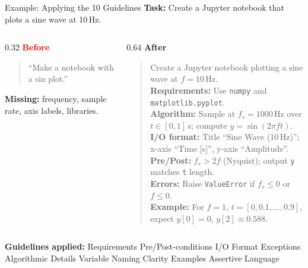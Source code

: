\documentclass[
11pt,notheorems,hyperref={pdfauthor=whatever}
]{beamer}
\begin{document}
\begin{frame}{Example: Applying the 10 Guidelines}
	\textbf{Task:} Create a Jupyter notebook that plots a sine wave at 10\,Hz.

	\vspace{0.2cm}

	\begin{columns}[T]
		\begin{column}{0.32\textwidth}
			\textbf{\textcolor{red}{Before}}
			\begin{quote}
				\footnotesize ``Make a notebook with a sin plot.''
			\end{quote}
			\vspace{0.1cm}
			\scriptsize
			\textbf{Missing:} frequency, sample rate, axis labels, libraries.
		\end{column}
		\hfill
		\begin{column}{0.64\textwidth}
			\textbf{\textcolor{green!50!black}{After}}
			\begin{quote}
				\scriptsize
				Create a Jupyter notebook plotting a sine wave at $f=10$\,Hz.\\[1pt]
				\textbf{Requirements:} Use \texttt{numpy} and \texttt{matplotlib.pyplot}.\\[1pt]
				\textbf{Algorithm:} Sample at $f_s=1000$\,Hz over $t\in[0,1]$\,s; compute $y=\sin(2\pi f t)$.\\[1pt]
				\textbf{I/O format:} Title ``Sine Wave (10\,Hz)''; x-axis ``Time [s]'', y-axis ``Amplitude''.\\[1pt]
				\textbf{Pre/Post:} $f_s>2f$ (Nyquist); output \texttt{y} matches \texttt{t} length.\\[1pt]
				\textbf{Errors:} Raise \texttt{ValueError} if $f_s\leq0$ or $f\leq0$.\\[1pt]
				\textbf{Example:} For $f=1$, $t=[0,0.1,\dots,0.9]$, expect $y[0]=0$, $y[2]\approx0.588$.
			\end{quote}
		\end{column}
	\end{columns}

	\vspace{0.25cm}

	\tiny
	\textbf{Guidelines applied:} Requirements \checkmark\; Pre/Post-conditions \checkmark\; I/O Format \checkmark\; Exceptions \checkmark\; Algorithmic Details \checkmark\; Variable Naming \checkmark\; Clarity \checkmark\; Examples \checkmark\; Assertive Language \checkmark
\end{frame}
\end{document}
